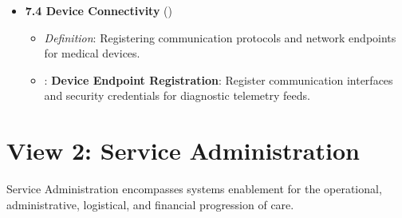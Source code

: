 \begin{itemize}
\begin{itemize}
\item 
\texttt{}: \textbf{Device-Patient/\allowbreak{}Location Assignment}: Track dynamic association between a telemetry monitor, patient, and physical bed.



\end{itemize}


\item 
\textbf{7.4 Device Connectivity} (\texttt{})


\begin{itemize}

\item 
\emph{Definition}: Registering communication protocols and network endpoints for medical devices.



\item 
\texttt{}: \textbf{Device Endpoint Registration}: Register communication interfaces and security credentials for diagnostic telemetry feeds.



\end{itemize}


\end{itemize}
\label{rad:enabling:234}

\par\smallskip
{}\label{rad:enabling:236}
\section*{View 2: Service Administration}
\label{rad:enabling:238}

Service Administration encompasses systems enablement for the operational, administrative, logistical, and financial progression of care.

\label{rad:enabling:240}

